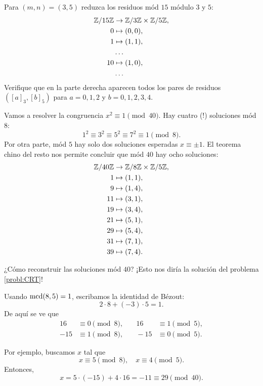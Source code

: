 \documentclass{article}
\begin{document}
\begin{problema}
  Para $(m,n) = (3,5)$ reduzca los residuos mód $15$ módulo $3$ y $5$:
  \begin{align*}
    \mathbb{Z}/15\mathbb{Z} & \to \mathbb{Z}/3\mathbb{Z} \times \mathbb{Z}/5\mathbb{Z}, \\
    0 & \mapsto (0,0), \\
    1 & \mapsto (1,1), \\
              & \ldots \\
    10 & \mapsto (1,0), \\
      & \ldots
  \end{align*}
  Verifique que en la parte derecha aparecen todos los pares de residuos
  $([a]_3, [b]_5)$ para $a = 0,1,2$ y $b = 0,1,2,3,4$.
\end{problema}

\begin{ejemplo}
  Vamos a resolver la congruencia $x^2 \equiv 1 \pmod{40}$.
  Hay cuatro (!)  soluciones mód $8$:
  $$1^2 \equiv 3^2 \equiv 5^2 \equiv 7^2 \equiv 1 \pmod{8}.$$
  Por otra parte, mód $5$ hay solo dos soluciones esperadas $x \equiv \pm 1$.
  El teorema chino del resto nos permite concluir que mód $40$ hay ocho
  soluciones:
    \begin{align*}
      \mathbb{Z}/40\mathbb{Z} & \to \mathbb{Z}/8\mathbb{Z} \times \mathbb{Z}/5\mathbb{Z}, \\
      1 & \mapsto (1, 1), \\
      9 & \mapsto (1, 4), \\
      11 & \mapsto (3, 1), \\
      19 & \mapsto (3, 4), \\
      21 & \mapsto (5, 1), \\
      29 & \mapsto (5, 4), \\
      31 & \mapsto (7, 1), \\
      39 & \mapsto (7, 4).
    \end{align*}

  ¿Cómo reconstruir las soluciones mód $40$?
  ¡Esto nos diría la solución del problema \ref{probl:CRT}!

  Usando $\operatorname{mcd}(8,5) = 1$, escribamos la identidad de Bézout:
  $$2\cdot 8 + (-3)\cdot 5 = 1.$$
  De aquí se ve que
  \begin{align*}
    16 & \equiv 0 \pmod{8}, & \quad 16 & \equiv 1 \pmod{5}, \\
    -15 & \equiv 1 \pmod{8}, & \quad -15 & \equiv 0 \pmod{5}.
  \end{align*}

  Por ejemplo, buscamos $x$ tal que
  $$x \equiv 5 \pmod{8}, \quad x \equiv 4 \pmod{5}.$$
  Entonces,
  $$x = 5\cdot (-15) + 4\cdot 16 = -11 \equiv 29 \pmod{40}.$$
\end{ejemplo}
\end{document}
